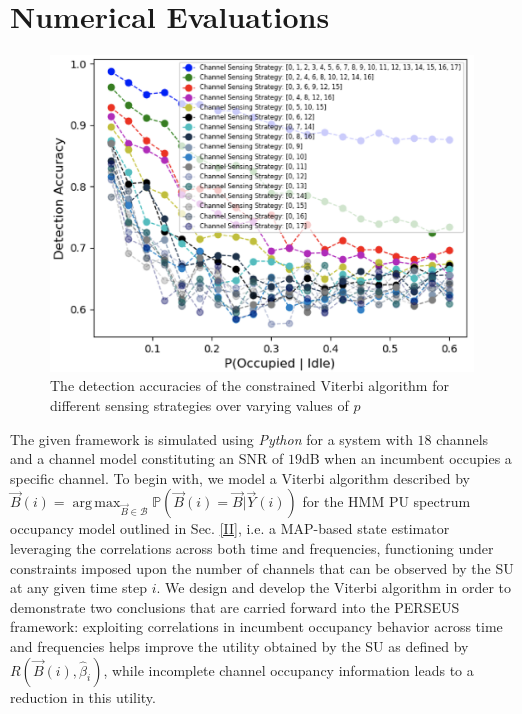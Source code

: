 \documentclass[10pt,twocolumn]{IEEEtran}
\DeclareMathOperator*{\argmax}{arg\,max}
\begin{document}
\section{Numerical Evaluations}\label{IV}
\begin{figure}
    \centering
    \includegraphics[width=0.75\linewidth]{ViterbiDetectionAccuracies.png}
    \caption{The detection accuracies of the constrained Viterbi algorithm for different sensing strategies over varying values of $p$}
    \vspace{-5mm}
    \label{fig:2}
\end{figure}

The given framework is simulated using \emph{Python} for a system with $18$ channels and a channel model constituting an SNR of $19$dB when an incumbent occupies a specific channel. To begin with, we model a Viterbi algorithm described by $\vec{B}(i){=}\argmax_{\vec{B}{\in}\mathcal{B}} \mathbb{P}(\vec{B}(i){=}\vec{B}|\vec{Y}(i))$ for the HMM PU spectrum occupancy model outlined in Sec. \ref{II}, i.e. a MAP-based state estimator leveraging the correlations across both time and frequencies, functioning under constraints imposed upon the number of channels that can be observed by the SU at any given time step $i$. We design and develop the Viterbi algorithm in order to demonstrate two conclusions that are carried forward into the PERSEUS framework: exploiting correlations in incumbent occupancy behavior across time and frequencies helps improve the utility obtained by the SU as defined by $R(\vec{B}(i), \hat{\beta}_{i})$, while incomplete channel occupancy information leads to a reduction in this utility. 
\end{document}
